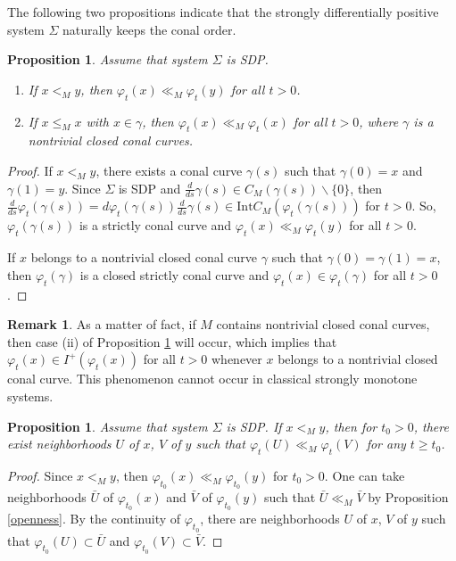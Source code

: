 \documentclass[a4paper,11pt]{article}
\theoremstyle{plain}
\newtheorem{prop}[thm]{Proposition}
\theoremstyle{definition}
\newtheorem{rmk}[thm]{Remark}
\numberwithin{equation}{section}
\begin{document}
\vskip 3mm


The following two propositions indicate that the strongly differentially positive system $\Sigma$ naturally keeps the conal order.

	\begin{prop}\label{monotone property}
		Assume that system $\Sigma$ is {\rm SDP}. 
		\begin{enumerate}[{\rm (i)}]
			\item	If $x<_M y$, then $\varphi_t(x)\ll_M \varphi_t(y)$ for all $t>0$.
			\item   If $x\leq_M x$ with $x\in \gamma$, then $\varphi_t(x)\ll_M \varphi_t(x)$ for all $t>0$, where $\gamma$ is a nontrivial closed conal curves.
		\end{enumerate}
	\end{prop}
	\begin{proof}
		If $x<_M y$, there exists a conal curve $\gamma(s)$ such that $\gamma(0)=x$ and $\gamma(1)=y$. Since $\Sigma$ is SDP and $\frac{d}{ds}\gamma(s)\in C_{M}(\gamma(s))\backslash \{ 0\}$, then $\frac{d}{ds}\varphi_t(\gamma(s))=d\varphi_t(\gamma(s))\frac{d}{ds}\gamma(s)\in \text{Int} C_{M}(\varphi_t(\gamma(s)))$ for $t>0$. So, $\varphi_t(\gamma(s))$ is a strictly conal curve and $\varphi_t(x)\ll_M \varphi_t(y)$ for all $t>0$.
		
		If $x$ belongs to a nontrivial closed conal curve $\gamma$ such that $\gamma(0)=\gamma(1)=x$, then $\varphi_t(\gamma)$ is a closed strictly conal curve and $\varphi_t(x)\in \varphi_t(\gamma)$ for all $t>0$.
	\end{proof}
	
	\begin{rmk}\label{closed-conal-curve}
		As a matter of fact, if $M$ contains nontrivial closed conal curves, then case (ii) of Proposition \ref{monotone property} will occur, which implies that $\varphi_t(x)\in I^{+}(\varphi_t(x))$ for all $t>0$ whenever $x$ belongs to a nontrivial closed conal curve. This phenomenon cannot occur in classical strongly monotone systems.
	\end{rmk}
	
	


\begin{prop}\label{strong flow open relation}
	Assume that system $\Sigma$ is {\rm SDP}. If $x<_M y$, then for $t_0>0$, there exist neighborhoods $U$ of $x$, $V$ of $y$ such that $\varphi_{t}(U)\ll_M \varphi_{t}(V)$ for any $t\geq t_0$.
\end{prop}

\begin{proof}
	Since $x<_M y$, then $\varphi_{t_0}(x)\ll_M \varphi_{t_0}(y)$ for $t_0>0$. One can take neighborhoods $\bar{U}$ of $\varphi_{t_0}(x)$ and $\bar{V}$ of $\varphi_{t_0}(y)$ such that $\bar{U}\ll_M\bar{V}$ by Proposition \ref{openness}. By the continuity of $\varphi_{t_0}$, there are neighborhoods $U$ of $x$, $V$ of $y$ such that $\varphi_{t_0}(U)\subset \bar{U}$ and $\varphi_{t_0}(V)\subset \bar{V}$.
\end{proof}
\end{document}
